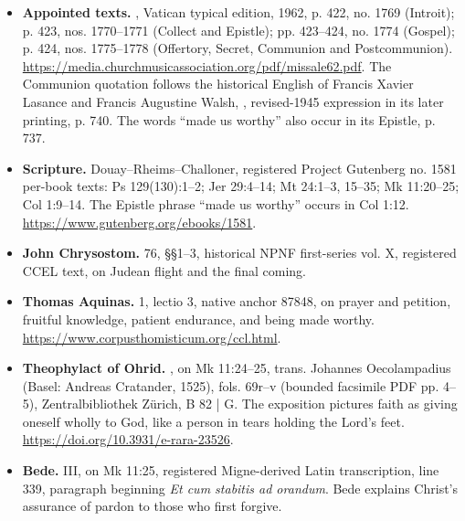 \begin{itemize}
\item \textbf{Appointed texts.}
, Vatican typical edition, 1962, p. 422, no. 1769
(Introit); p. 423, nos. 1770--1771 (Collect and Epistle); pp. 423--424,
no. 1774 (Gospel); p. 424, nos. 1775--1778 (Offertory, Secret, Communion
and Postcommunion).
\url{https://media.churchmusicassociation.org/pdf/missale62.pdf}.
The Communion quotation follows the historical English of Francis Xavier
Lasance and Francis Augustine Walsh, ,
revised-1945 expression in its later printing, p. 740. The words ``made us
worthy'' also occur in its Epistle, p. 737.

\item \textbf{Scripture.} Douay--Rheims--Challoner,
registered Project Gutenberg no. 1581 per-book texts:
Ps 129(130):1--2; Jer 29:4--14; Mt 24:1--3, 15--35; Mk 11:20--25;
Col 1:9--14.
The Epistle phrase ``made us worthy'' occurs in Col 1:12.
\url{https://www.gutenberg.org/ebooks/1581}.

\item \textbf{John Chrysostom.}
 76, §§1--3, historical NPNF first-series
vol. X, registered CCEL text, on Judean flight and the final coming.

\item \textbf{Thomas Aquinas.}
 1, lectio 3, native anchor 87848,
on prayer and petition, fruitful knowledge, patient endurance, and being
made worthy. \url{https://www.corpusthomisticum.org/ccl.html}.

\item \textbf{Theophylact of Ohrid.}
, on Mk 11:24--25, trans. Johannes Oecolampadius
(Basel: Andreas Cratander, 1525), fols. 69r--v (bounded facsimile PDF
pp. 4--5), Zentralbibliothek Zürich, B 82 | G. The exposition pictures
faith as giving oneself wholly to God, like a person in tears holding
the Lord's feet. \url{https://doi.org/10.3931/e-rara-23526}.

\item \textbf{Bede.}
 III, on Mk 11:25, registered
Migne-derived Latin transcription, line 339, paragraph beginning
\textit{Et cum stabitis ad orandum}. Bede explains Christ's assurance
of pardon to those who first forgive.
\end{itemize}
